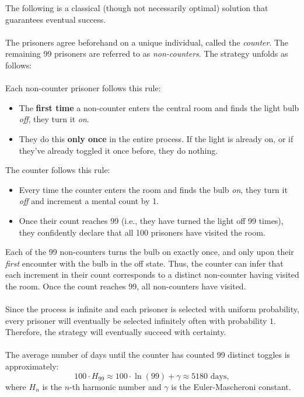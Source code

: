\begin{solution}
    The following is a classical (though not necessarily optimal) solution that guarantees eventual success.
    \\\\
    The prisoners agree beforehand on a unique individual, called the \textit{counter}. The remaining 99 prisoners are referred to as \textit{non-counters}. The strategy unfolds as follows:
    \\\\
    Each non-counter prisoner follows this rule:
    \begin{itemize}
        \item The \textbf{first time} a non-counter enters the central room and finds the light bulb \textit{off}, they turn it \textit{on}.
        \item They do this \textbf{only once} in the entire process. If the light is already on, or if they've already toggled it once before, they do nothing.
    \end{itemize}
    The counter follows this rule:
    \begin{itemize}
        \item Every time the counter enters the room and finds the bulb \textit{on}, they turn it \textit{off} and increment a mental count by 1.
        \item Once their count reaches 99 (i.e., they have turned the light off 99 times), they confidently declare that all 100 prisoners have visited the room.
    \end{itemize}
    Each of the 99 non-counters turns the bulb on exactly once, and only upon their \textit{first} encounter with the bulb in the off state. Thus, the counter can infer that each increment in their count corresponds to a distinct non-counter having visited the room. Once the count reaches 99, all non-counters have visited.
    \\\\
    Since the process is infinite and each prisoner is selected with uniform probability, every prisoner will eventually be selected infinitely often with probability \( 1 \). Therefore, the strategy will eventually succeed with certainty.
    \\\\
    The average number of days until the counter has counted 99 distinct toggles is approximately:
    \[
        100 \cdot H_{99} \approx 100 \cdot \ln\left(99\right) + \gamma \approx 5180 \text{ days},
    \]
    where \( H_n \) is the \( n \)-th harmonic number and \( \gamma \) is the Euler-Mascheroni constant.

\end{solution}
